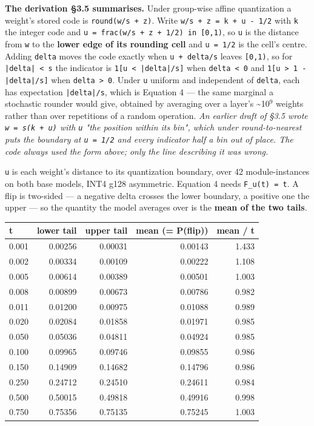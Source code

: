 \textbf{The derivation \S{}3.5 summarises.} Under group-wise affine quantization a weight's stored code is \texttt{round(w/\allowbreak{}s + z)}. Write \texttt{w/\allowbreak{}s + z = k + u - 1/\allowbreak{}2} with \texttt{k} the integer code and \texttt{u = frac(w/\allowbreak{}s + z + 1/\allowbreak{}2) in [0,1)}, so \texttt{u} is the distance from \texttt{w} to the \textbf{lower edge of its rounding cell} and \texttt{u = 1/\allowbreak{}2} is the cell's centre. Adding \texttt{delta} moves the code exactly when \texttt{u + delta/\allowbreak{}s} leaves \texttt{[0,1)}, so for \texttt{|delta| < s} the indicator is \texttt{1[u < |delta|/\allowbreak{}s]} when \texttt{delta < 0} and \texttt{1[u > 1 - |delta|/\allowbreak{}s]} when \texttt{delta > 0}. Under \texttt{u} uniform and independent of \texttt{delta}, each has expectation \texttt{|delta|/\allowbreak{}s}, which is Equation 4 --- the same marginal a stochastic rounder would give, obtained by averaging over a layer's \textasciitilde{}10$^{9}$ weights rather than over repetitions of a random operation. \emph{An earlier draft of \S{}3.5 wrote \texttt{w = s(k + u)} with \texttt{u} "the position within its bin", which under round-to-nearest puts the boundary at \texttt{u = 1/\allowbreak{}2} and every indicator half a bin out of place. The code always used the form above; only the line describing it was wrong.}

\texttt{u} is each weight's distance to its quantization boundary, over 42 module-instances on both base models, INT4 g128 asymmetric. Equation 4 needs \texttt{F\_\allowbreak{}u(t) = t}. A flip is two-sided --- a negative delta crosses the lower boundary, a positive one the upper --- so the quantity the model averages over is the \textbf{mean of the two tails}.

\begin{center}\footnotesize
\begin{tabular}{lrrrr}
\toprule
t & lower tail & upper tail & mean (= P(flip)) & mean / t \\
\midrule
0.001 & 0.00256 & 0.00031 & 0.00143 & 1.433 \\
0.002 & 0.00334 & 0.00109 & 0.00222 & 1.108 \\
0.005 & 0.00614 & 0.00389 & 0.00501 & 1.003 \\
0.008 & 0.00899 & 0.00673 & 0.00786 & 0.982 \\
0.011 & 0.01200 & 0.00975 & 0.01088 & 0.989 \\
0.020 & 0.02084 & 0.01858 & 0.01971 & 0.985 \\
0.050 & 0.05036 & 0.04811 & 0.04924 & 0.985 \\
0.100 & 0.09965 & 0.09746 & 0.09855 & 0.986 \\
0.150 & 0.14909 & 0.14682 & 0.14796 & 0.986 \\
0.250 & 0.24712 & 0.24510 & 0.24611 & 0.984 \\
0.500 & 0.50015 & 0.49818 & 0.49916 & 0.998 \\
0.750 & 0.75356 & 0.75135 & 0.75245 & 1.003 \\
\bottomrule
\end{tabular}
\end{center}

